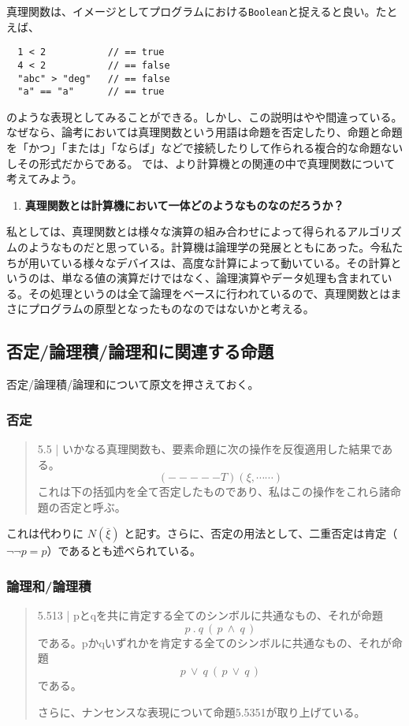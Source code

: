 \documentclass[a4paper,onecolumn,article]{jarticle}
\newcounter{ct}               %
\begin{document}
真理関数は、イメージとしてプログラムにおける\texttt{Boolean}と捉えると良い。たとえば、
\begin{verbatim}
  1 < 2           // == true
  4 < 2           // == false
  "abc" > "deg"   // == false
  "a" == "a"      // == true
\end{verbatim}
のような表現としてみることができる。しかし、この説明はやや間違っている。なぜなら、論考においては真理関数という用語は命題を否定したり、命題と命題を「かつ」「または」「ならば」などで接続したりして作られる複合的な命題ないしその形式だからである。
では、より計算機との関連の中で真理関数について考えてみよう。
\begin{enumerate}
  \item {\bf 真理関数とは計算機において一体どのようなものなのだろうか？ }
\end{enumerate}

私としては、真理関数とは様々な演算の組み合わせによって得られるアルゴリズムのようなものだと思っている。計算機は論理学の発展とともにあった。今私たちが用いている様々なデバイスは、高度な計算によって動いている。その計算というのは、単なる値の演算だけではなく、論理演算やデータ処理も含まれている。その処理というのは全て論理をベースに行われているので、真理関数とはまさにプログラムの原型となったものなのではないかと考える。

\subsection{否定/論理積/論理和に関連する命題}

否定/論理積/論理和について原文を押さえておく。

\subsubsection{否定}

\begin{quote}
  5.5 | いかなる真理関数も、要素命題に次の操作を反復適用した結果である。
  \[ (-----T)(\xi, \cdots \cdots) \]
  これは下の括弧内を全て否定したものであり、私はこの操作をこれら諸命題の否定と呼ぶ。
\end{quote}

これは代わりに
$ N( \overline{ \xi } ) $
と記す。さらに、否定の用法として、二重否定は肯定（$\lnot \lnot p = p$）であるとも述べられている。
\subsubsection{論理和/論理積}
\begin{quote}
  5.513 | pとqを共に肯定する全てのシンボルに共通なもの、それが命題
  \[
     p \ . \ q  \ ( \, p \ \land \ q\, )
  \]
    である。pかqいずれかを肯定する全てのシンボルに共通なもの、それが命題
  \[
     p \ \vee \ q \ ( \, p \ \lor \ q \,)
  \]
    である。

  さらに、ナンセンスな表現について命題5.5351が取り上げている。
\end{quote}
\end{document}
